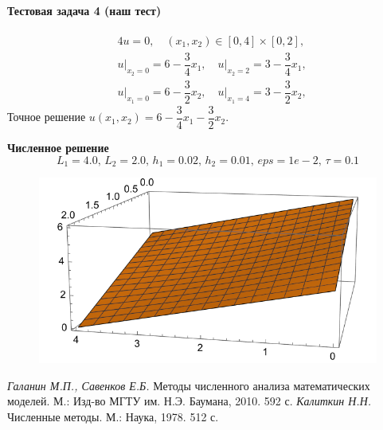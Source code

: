 \documentclass[12pt, a4paper]{article}
\begin{document}
		\paragraph{Тестовая задача 4 (наш тест)}
	\begin{eqnarray*}
		& \mathcal{4}u = 0, \quad (x_1, x_2) \in [0, 4]\times [0, 2],\\
		& u\Big|_{x_2 = 0} = 6 - \dfrac34 x_1, \quad u\Big|_{x_2 = 2} = 3 - \dfrac34 x_1,\\
		& u\Big|_{x_1 = 0} = 6 - \dfrac32 x_2, \quad u\Big|_{x_1 = 4} = 3 - \dfrac32 x_2,
	\end{eqnarray*}
	Точное решение $u(x_1,x_2)=6 - \dfrac34 x_1 - \dfrac32 x_2$.
	
	\textbf{Численное решение} $$L_1=4.0,\,L_2=2.0,\,h_1=0.02,\,h_2=0.01,\,eps=1e-2,\,\tau=0.1$$
	\begin{figure}[H]
		\centering
		\includegraphics[width=0.7\linewidth]{mytest.png}
	\end{figure}
	\newpage
	\begin{thebibliography}{1}
		 \textit{Галанин М.П., Савенков Е.Б.} Методы численного анализа математических\\ моделей. М.: Изд-во МГТУ им. Н.Э. Баумана,	2010. 592 с.
		 \textit{Калиткин Н.Н.} Численные методы. М.: Наука, 1978. 512 с.
		
		
	\end{thebibliography}
	
	
\end{document}

